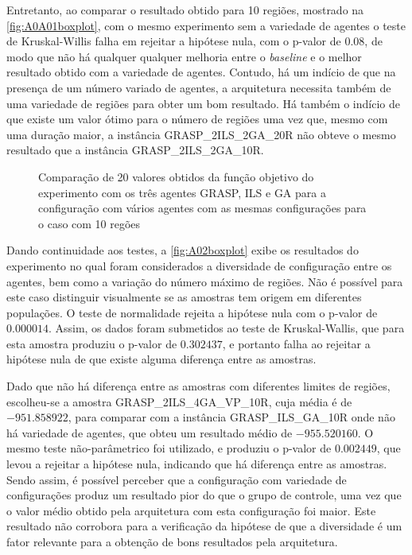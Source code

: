 Entretanto, ao comparar o resultado obtido para 10 regiões, mostrado na \autoref{fig:A0A01boxplot}, com o mesmo experimento sem a variedade de agentes o teste de Kruskal-Willis falha em rejeitar a hipótese nula, com o p-valor de $0.08$, de modo que não há qualquer qualquer melhoria entre o \textit{baseline} e o melhor resultado obtido com a variedade de agentes. Contudo, há um indício de que na presença de um número variado de agentes, a arquitetura necessita também de uma variedade de regiões para obter um bom resultado. Há também o indício de que existe um valor ótimo para o número de regiões uma vez que, mesmo com uma duração maior, a instância GRASP\_2ILS\_2GA\_20R não obteve o mesmo resultado que a instância  GRASP\_2ILS\_2GA\_10R.

\begin{figure}
    \centering
    
    \caption{Comparação de 20 valores obtidos da função objetivo do experimento com os três agentes GRASP, ILS e GA para a configuração com vários agentes com as mesmas configurações para o caso com 10 regões}
    \label{fig:A0A01boxplot}
\end{figure}

Dando continuidade aos testes, a \autoref{fig:A02boxplot} exibe os resultados do experimento no qual foram considerados a diversidade de configuração entre os agentes, bem como a variação do número máximo de regiões. Não é possível para este caso distinguir visualmente se as amostras tem origem em diferentes populações. O teste de normalidade rejeita a hipótese nula com o p-valor de $0.000014$. Assim, os dados foram submetidos ao teste de Kruskal-Wallis, que  para esta amostra produziu o p-valor de $0.302437$, e portanto falha ao rejeitar a hipótese nula de que existe alguma diferença entre as amostras. 

Dado que não há diferença entre as amostras com diferentes limites de regiões, escolheu-se a amostra GRASP\_2ILS\_4GA\_VP\_10R, cuja média é de $-951.858922$, para comparar com a instância GRASP\_ILS\_GA\_10R onde não há variedade de agentes, que obteu um resultado médio de $-955.520160$. O mesmo teste não-parâmetrico foi utilizado, e produziu o p-valor de $0.002449$, que levou a rejeitar a hipótese nula, indicando que há diferença entre as amostras. Sendo assim, é possível perceber que a configuração com variedade de configurações produz um resultado pior do que o grupo de controle, uma vez que o valor médio obtido pela arquitetura com esta configuração foi maior. Este resultado não corrobora para a verificação da hipótese de que a diversidade é um fator relevante para a obtenção de bons resultados pela arquitetura. 

